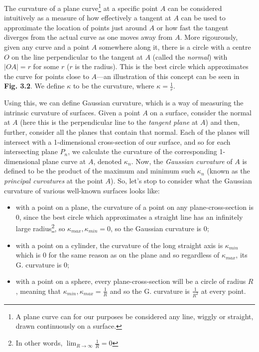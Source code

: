 \begin{multicols}{2}

The curvature of a plane curve\footnote{ A plane curve can for our purposes be considered any line, wiggly or straight, drawn continuously on a surface.} at a specific point \(A\) can be considered intuitively as a measure of how effectively a tangent at \(A\) can be used to approximate the location of points just around \(A\) or how fast the tangent diverges from the actual curve as one moves away from \(A\). More rigourously, given any curve and a point \(A\) somewhere along it, there is a circle with a centre \(O\) on the line perpendicular to the tangent at \(A\) (called the \textit{normal}) with \(|OA| = r\) for some \(r\) (\(r\) is the radius). This is the best circle which approximates the curve for points close to \(A\)---an illustration of this concept can be seen in \textbf{Fig. 3.2}. We define \(\kappa\) to be the curvature, where \(\kappa = \frac{1}{r}\).

Using this, we can define Gaussian curvature, which is a way of measuring the intrinsic curvature of surfaces. Given a point \(A\) on a surface, consider the normal at \(A\) (here this is the perpendicular line to the \textit{tangent plane} at \(A\)) and then, further, consider all the planes that contain that normal. Each of the planes will intersect with a 1-dimensional cross-section of our surface, and so for each intersecting plane \(P_n\), we calculate the curvature of the corresponding 1-dimensional plane curve at \(A\), denoted \(\kappa_n\). Now, the \textit{Gaussian curvature} of \(A\) is defined to be the product of the maximum and minimum such \(\kappa_n\) (known as the \textit{principal curvatures} at the point \(A\)). So, let's stop to consider what the Gaussian curvature of various well-known surfaces looks like: 
\begin{itemize}
\item with a point on a plane, the curvature of a point on any plane-cross-section is 0, since the best circle which approximates a straight line has an infinitely large radius\footnote{In other words, \( \lim_{R \to \infty} \frac{1}{R} = 0\)}, so \(\kappa_{max}, \kappa_{min} = 0\), so the Gaussian curvature is 0; 
\item with a point on a cylinder, the curvature of the long straight axis is \(\kappa_{min}\) which is 0 for the same reason as on the plane and so regardless of \(\kappa_{max}\), its G. curvature is 0; 
\item with a point on a sphere, every plane-cross-section will be a circle of radius \(R\), meaning that \(\kappa_{min}, \kappa_{max} = \frac{1}{R}\) and so the G. curvature is \(\frac{1}{R^2}\) at every point.
\end{itemize}

\end{multicols}
 
